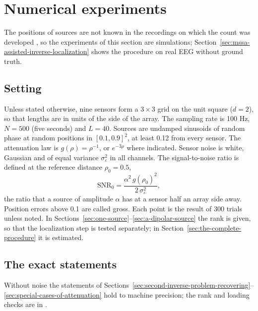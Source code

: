 \documentclass{article}
\begin{document}
\section{Numerical experiments}\label{sec:numerical-experiments}

The positions of sources are not known in the recordings on which the count was developed \cite{ref-BernadotteBuchstaber, ref-Bernadotte05, ref-companionA}, so the experiments of this section are simulations; Section~\ref{sec:mssa-assisted-inverse-localization} shows the procedure on real EEG without ground truth.

\subsection{Setting}\label{sec:setting}

Unless stated otherwise, nine sensors form a $3 \times 3$ grid on the unit square ($d = 2$), so that lengths are in units of the side of the array. The sampling rate is 100 Hz, $N = 500$ (five seconds) and $L = 40$. Sources are undamped sinusoids of random phase at random positions in $[0.1, 0.9]^2$, at least 0.12 from every sensor. The attenuation law is $g(\rho) = \rho^{-1}$, or $e^{-3\rho}$ where indicated. Sensor noise is white, Gaussian and of equal variance $\sigma_\varepsilon^{2}$ in all channels. The signal-to-noise ratio is defined at the reference distance $\rho_0 = 0.5$, \[
\mathrm{SNR}_0 = \frac{\alpha^{2}\, g(\rho_0)^{2}}{2\, \sigma_\varepsilon^{2}},
\] the ratio that a source of amplitude $\alpha$ has at a sensor half an array side away. Position errors above 0.1 are called gross. Each point is the result of 300 trials unless noted. In Sections~\ref{sec:one-source}--\ref{sec:a-dipolar-source} the rank is given, so that the localization step is tested separately; in Section~\ref{sec:the-complete-procedure} it is estimated.

\subsection{The exact statements}\label{sec:the-exact-statements}

Without noise the statements of Sections~\ref{sec:second-inverse-problem-recovering}--\ref{sec:special-cases-of-attenuation} hold to machine precision; the rank and loading checks are in \cite{ref-companionA}.
\end{document}
